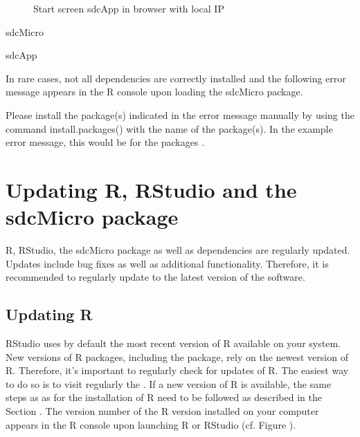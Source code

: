 \documentclass[letterpaper,10pt,english]{sphinxmanual}
\begin{document}
\begin{figure}[htbp]
\centering
\capstart

\noindent{}
\caption{Start screen sdcApp in browser with local IP}\label{\detokenize{installation:fig26}}\label{\detokenize{installation:id12}}\end{figure}

\def\sphinxLiteralBlockLabel{\label{\detokenize{installation:code02}}}
%
\begin{sphinxVerbatim}[commandchars=\\\{\},numbers=left,firstnumber=1,stepnumber=1]
sdcMicro

sdcApp
\end{sphinxVerbatim}

In rare cases, not all dependencies are correctly installed and the following error
message appears in the R console upon loading the sdcMicro package.

Please install the package(s) indicated in the error message manually by using the
command install.packages() with the name of the package(s). In the example error message,
this would be for the packages .


\section{Updating R, RStudio and the sdcMicro package}
\label{\detokenize{installation:updating-r-rstudio-and-the-sdcmicro-package}}
R, RStudio, the sdcMicro package as well as dependencies are regularly updated. Updates include
bug fixes as well as additional functionality. Therefore,
it is recommended to regularly update to the latest version of the software.


\subsection{Updating R}
\label{\detokenize{installation:updating-r}}
RStudio uses by default the most recent version of R available on your system. New
versions of R packages, including the  package, rely on the newest version of R. Therefore,
it’s important to regularly check for updates of R. The easiest way to do so
is to visit regularly the .
If a new version of R is available, the same steps as as for the installation of R need to be followed
as described in the Section {\hyperref[\detokenize{installation:installing-r-and-rstudio}]{}}. The version number of the
R version installed on your computer appears in the R console upon launching R or RStudio
(cf. Figure ).
\end{document}
